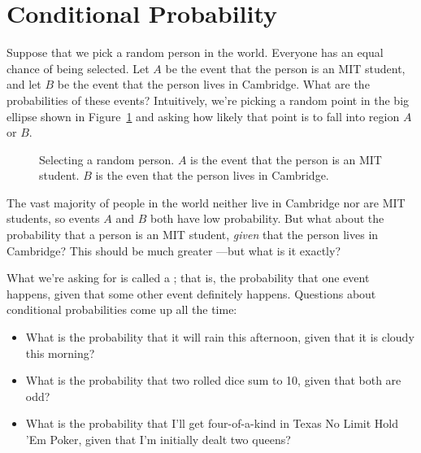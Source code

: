 \begin{problems}
\classproblems
{}

\homeworkproblems
{}

\end{problems}


\section{Conditional Probability}\label{cond_prob_sec}

Suppose that we pick a random person in the world.  Everyone has an
equal chance of being selected.  Let $A$ be the event that the person
is an MIT student, and let $B$ be the event that the person lives in
Cambridge.  What are the probabilities of these events?  Intuitively,
we're picking a random point in the big ellipse shown in
Figure~\ref{fig:15B1} and asking how likely that point is to fall into
region $A$ or $B$.

\begin{figure}[h]


\caption{Selecting a random person.  $A$ is the event that the person
  is an MIT student.  $B$ is the even that the person lives in
  Cambridge.}

\label{fig:15B1}

\end{figure}

The vast majority of people in the world neither live in Cambridge nor
are MIT students, so events $A$ and $B$ both have low probability.
But what about the probability that a person is an MIT student,
\emph{given} that the person lives in Cambridge?  This should be
much greater ---but what is it exactly?

What we're asking for is called a ; that
is, the probability that one event happens, given that some other
event definitely happens.  Questions about conditional probabilities
come up all the time:
%
\begin{itemize}
\item What is the probability that it will rain this afternoon, given
that it is cloudy this morning?
\item What is the probability that two rolled dice sum to 10, given
that both are odd?
\item What is the probability that I'll get four-of-a-kind in Texas No
Limit Hold 'Em Poker, given that I'm initially dealt two queens?
\end{itemize}

